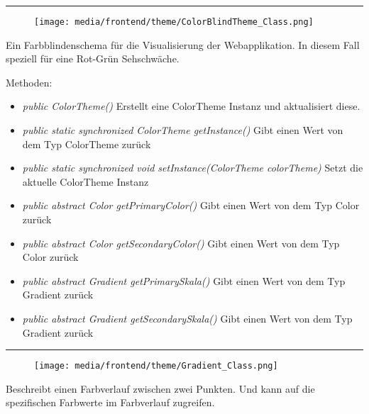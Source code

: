\begin{itemize}
\rule{\textwidth}{0.4pt} 
\begin{minipage}{0.3\textwidth}
\begin{figure}[H]
    \texttt{[image: media/frontend/theme/ColorBlindTheme\_Class.png]}
\end{figure}
\end{minipage} \hfill
\begin{minipage}{0.6\textwidth}
    Ein Farbblindenschema für die Visualisierung der Webapplikation. In diesem Fall speziell für eine Rot-Grün Sehschwäche.
\end{minipage}

Methoden:
\begin{itemize} 
    \item \emph{public ColorTheme()} Erstellt eine ColorTheme Instanz und aktualisiert diese.
    \item \emph{public static synchronized ColorTheme getInstance()} Gibt einen Wert von dem Typ ColorTheme zurück
    \item \emph{public static synchronized void setInstance(ColorTheme colorTheme)} Setzt die aktuelle ColorTheme Instanz
    \item \emph{public abstract Color getPrimaryColor()} Gibt einen Wert von dem Typ Color zurück
    \item \emph{public abstract Color getSecondaryColor()} Gibt einen Wert von dem Typ Color zurück
    \item \emph{public abstract Gradient getPrimarySkala()} Gibt einen Wert von dem Typ Gradient zurück
    \item \emph{public abstract Gradient getSecondarySkala()}  Gibt einen Wert von dem Typ Gradient zurück
\end{itemize}

\rule{\textwidth}{0.4pt}  
\begin{minipage}{0.3\textwidth}
    \begin{figure}[H]
    \texttt{[image: media/frontend/theme/Gradient\_Class.png]}
    \end{figure}
    \end{minipage} \hfill
    \begin{minipage}{0.6\textwidth}
    Beschreibt einen Farbverlauf zwischen zwei Punkten. Und kann auf die spezifischen Farbwerte im Farbverlauf zugreifen.
    \end{minipage}


\end{itemize}
